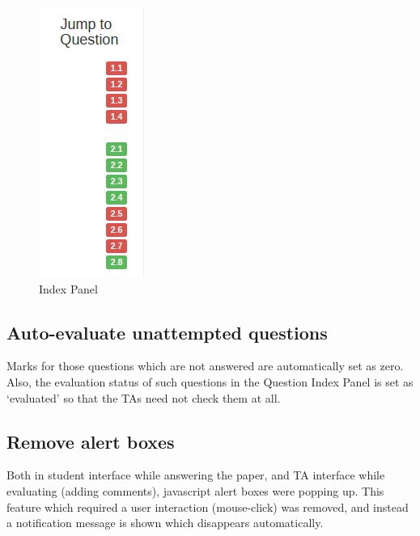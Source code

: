 \begin{figure}[H]
\includegraphics{images/index_panel}
\caption{Index Panel}
\label{fig:index_panel}
\end{figure}

\subsection{Auto-evaluate unattempted questions}
Marks for those questions which are not answered are automatically set as zero. Also, the evaluation status of such questions in the Question Index Panel is set as `evaluated' so that the TAs need not check them at all.

\subsection{Remove alert boxes}
Both in student interface while answering the paper, and TA interface while evaluating (adding comments), javascript alert boxes were popping up. This feature which required a user interaction (mouse-click) was removed, and instead a notification message is shown which disappears automatically.
